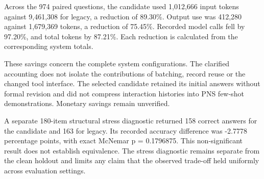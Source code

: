 Across the 974 paired questions, the candidate used 1,012,666 input tokens against 9,461,308 for legacy, a reduction of 89.30\%. Output use was 412,280 against 1,679,369 tokens, a reduction of 75.45\%. Recorded model calls fell by 97.20\%, and total tokens by 87.21\%. Each reduction is calculated from the corresponding system totals.

These savings concern the complete system configurations. The clarified accounting does not isolate the contributions of batching, record reuse or the changed tool interface. The selected candidate retained its initial answers without formal revision and did not compress interaction histories into PNS few-shot demonstrations. Monetary savings remain unverified.

A separate 180-item structural stress diagnostic returned 158 correct answers for the candidate and 163 for legacy. Its recorded accuracy difference was -2.7778 percentage points, with exact McNemar p = 0.1796875. This non-significant result does not establish equivalence. The stress diagnostic remains separate from the clean holdout and limits any claim that the observed trade-off held uniformly across evaluation settings.
